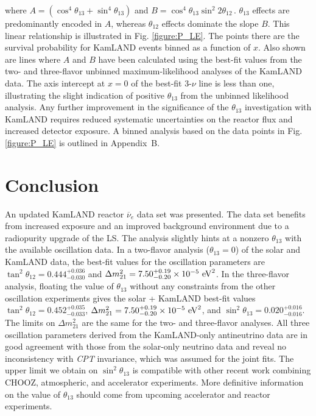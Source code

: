 \documentclass[aps,prc,twocolumn,groupedaddress,showpacs,amsmath,amssymb,floatfix,superscriptaddress]{revtex4}
\begin{document}
where $A = (\cos^{4}\theta_{13} + \sin^{4}\theta_{13}) $ and $B = \cos^{4}\theta_{13}\sin^{2}2\theta_{12}$\,. $\theta_{13}$ effects are predominantly encoded in $A$, whereas $\theta_{12}$ effects dominate the slope $B$. This linear relationship is illustrated in Fig. \ref{figure:P_LE}. The points there are the survival probability for KamLAND events binned as a function of $x$. Also shown are lines where $A$ and $B$ have been calculated using the best-fit values from the two- and three-flavor unbinned maximum-likelihood analyses of the KamLAND data.  The axis intercept at $x=0$ of the best-fit 3-$\nu$ line is less than one, illustrating the slight indication of positive $\theta_{13}$ from the unbinned likelihood analysis.  Any further improvement in the significance of the $\theta_{13}$ investigation with KamLAND requires reduced systematic uncertainties on the reactor flux and increased detector exposure.  A binned analysis based on the data points in Fig. \ref{figure:P_LE} is outlined in Appendix~B.

\section{Conclusion}
\label{section:Conclusion}

An updated KamLAND reactor $\overline{\nu}_{e}$ data set was presented. The data set benefits from increased exposure and an improved background environment due to a radiopurity upgrade of the LS.  The analysis slightly hints at a nonzero $\theta_{13}$ with the available oscillation data.   In a two-flavor analysis ($\theta_{13} = 0$) of the solar and KamLAND data, the best-fit values for the oscillation parameters are $\tan^{2} \theta_{12} = 0.444^{+0.036}_{-0.030}$ and $\Delta m^{2}_{21} = 7.50^{+0.19}_{-0.20} \times 10^{-5} ~ {\rm eV}^{2}$.  In the three-flavor analysis, floating the value of $\theta_{13}$ without any constraints from the other oscillation experiments gives the solar + KamLAND best-fit values $\tan^{2} \theta_{12} = 0.452^{+0.035}_{-0.033}$, $\Delta m^{2}_{21} = 7.50^{+0.19}_{-0.20} \times 10^{-5} ~ {\rm eV}^{2}$, and $\sin^{2} \theta_{13} = 0.020^{+0.016}_{-0.016}$.  The limits on $\Delta m^{2}_{21}$ are the same for the two- and three-flavor analyses. 
All three oscillation parameters derived from the KamLAND-only antineutrino data are in good agreement with those from the solar-only neutrino data and reveal no inconsistency with {\it CPT} invariance, which was assumed for the joint fits. 
The upper limit we obtain on $\sin^{2} \theta_{13}$ is compatible with other recent work combining CHOOZ, atmospheric, and accelerator experiments. 
More definitive information on the value of $\theta_{13}$ should come from upcoming accelerator and reactor experiments.
\end{document}

